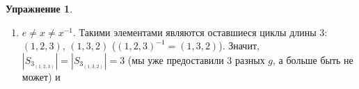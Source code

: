 \documentclass[12pt]{article}
\theoremstyle{definition}
\newtheorem{upr}[zad]{Упражнение}
\begin{document}
\begin{upr}
\begin{enumerate}
\begin{equation}
\begin{array}{ccc}
    1 & 2 & 3\\
    1 & 3 & 2\\
    2 & 3 & 1\\
    \end{array}
    \right)=(1,2,3)\neq (1,3,2)=\left(
    \begin{array}{ccc}
    1 & 2 & 3\\
    2 & 1 & 3\\
    3 & 1 & 2\\
    \end{array}
    \right)=(2,3)(1,2)
    \end{equation}
    \begin{equation}
        (1,2)(1,2,3)=\left(
    \begin{array}{ccc}
    1 & 2 & 3\\
    2 & 3 & 1\\
    1 & 3 & 2\\
    \end{array}
    \right)=(2,3)\neq (1,3)=\left(
    \begin{array}{ccc}
    1 & 2 & 3\\
    2 & 1 & 3\\
    3 & 2 & 1\\
    \end{array}
    \right)=(1,2,3)(1,2)
    \end{equation}
    \begin{equation}
        (1,2)(1,3,2)=\left(
    \begin{array}{ccc}
    1 & 2 & 3\\
    3 & 1 & 2\\
    3 & 2 & 1\\
    \end{array}
    \right)=(1,3)\neq (2,3)=\left(
    \begin{array}{ccc}
    1 & 2 & 3\\
    2 & 1 & 3\\
    1 & 3 & 2\\
    \end{array}
    \right)=(1,3,2)(1,2)
    \end{equation}
    Следовательно $|S_{3_{(1,2)}}|=|S_{3_{(1,3)}}|=|S_{3_{(2,3)}}|=2$ и
    \begin{equation}
        \boxed{S_{3_{(1,2)}}=\{e,(1,2)\},\quad S_{3_{(1,3)}}=\{e,(1,3)\},\quad S_{3_{(2,3)}}=\{e,(2,3)\}}
    \end{equation}
    \item $e\neq x\neq x^{-1}$. Такими элементами являются оставшиеся циклы длины 3: $(1,2,3)$, $(1,3,2)$ ($(1,2,3)^{-1}=(1,3,2)$). Значит, $|S_{3_{(1,2,3)}}|=|S_{3_{(1,3,2)}}|=3$ (мы уже предоставили 3 разных $g$, а больше быть не может) и

\end{enumerate}
\end{upr}
\end{document}
